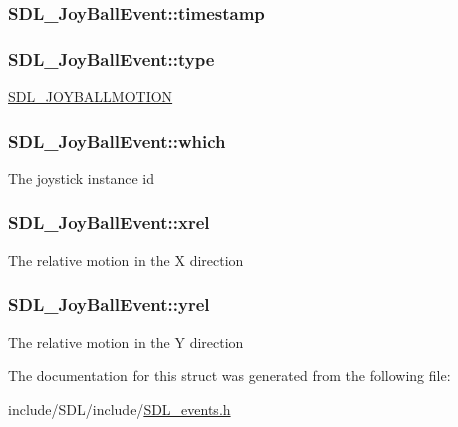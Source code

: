 \hypertarget{struct_s_d_l___joy_ball_event_aa8e4fb91af62e316bb9a3219ab76148d}{
\subsubsection[{timestamp}]{ S\-D\-L\-\_\-\-Joy\-Ball\-Event\-::timestamp}}\label{struct_s_d_l___joy_ball_event_aa8e4fb91af62e316bb9a3219ab76148d}
\hypertarget{struct_s_d_l___joy_ball_event_a0b192b95a043cb494b27ed9b27e84db1}{
\subsubsection[{type}]{ S\-D\-L\-\_\-\-Joy\-Ball\-Event\-::type}}\label{struct_s_d_l___joy_ball_event_a0b192b95a043cb494b27ed9b27e84db1}
\hyperlink{_s_d_l__events_8h_a3b589e89be6b35c02e0dd34a55f3fccaa78f859489cfd565c305c7f6f9d5b25c1}{S\-D\-L\-\_\-\-J\-O\-Y\-B\-A\-L\-L\-M\-O\-T\-I\-O\-N} \hypertarget{struct_s_d_l___joy_ball_event_a4e2e185717d529167cd0bea21093c454}{
\subsubsection[{which}]{ S\-D\-L\-\_\-\-Joy\-Ball\-Event\-::which}}\label{struct_s_d_l___joy_ball_event_a4e2e185717d529167cd0bea21093c454}
The joystick instance id \hypertarget{struct_s_d_l___joy_ball_event_a959a8473aa1964e5e1778c27a9ffd261}{
\subsubsection[{xrel}]{ S\-D\-L\-\_\-\-Joy\-Ball\-Event\-::xrel}}\label{struct_s_d_l___joy_ball_event_a959a8473aa1964e5e1778c27a9ffd261}
The relative motion in the X direction \hypertarget{struct_s_d_l___joy_ball_event_a28ad48a9eb7a5d3ff62ccba09fcead76}{
\subsubsection[{yrel}]{ S\-D\-L\-\_\-\-Joy\-Ball\-Event\-::yrel}}\label{struct_s_d_l___joy_ball_event_a28ad48a9eb7a5d3ff62ccba09fcead76}
The relative motion in the Y direction 

The documentation for this struct was generated from the following file\-:\begin{DoxyCompactItemize}
\item 
include/\-S\-D\-L/include/\hyperlink{_s_d_l__events_8h}{S\-D\-L\-\_\-events.\-h}\end{DoxyCompactItemize}
